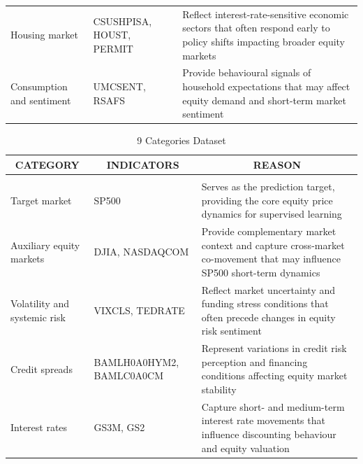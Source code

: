 \documentclass[10pt]{article} %
\begin{document}
\begin{table}[H]
\begin{center}
\begin{tabular}{p{3.4cm} p{4.8cm} p{6.2cm}}
Housing market
& CSUSHPISA, HOUST, PERMIT
& Reflect interest-rate-sensitive economic sectors that often respond early to policy shifts impacting broader equity markets \\[6pt]

Consumption and sentiment
& UMCSENT, RSAFS
& Provide behavioural signals of household expectations that may affect equity demand and short-term market sentiment \\

\end{tabular}
\end{center}
\end{table}



\begin{table}[H]
\caption{9 Categories Dataset}
\label{tab:9_Categories_Dataset}
\begin{center}
\begin{tabular}{p{3.4cm} p{4.8cm} p{6.2cm}}
\multicolumn{1}{c}{\bf CATEGORY} &
\multicolumn{1}{c}{\bf INDICATORS} &
\multicolumn{1}{c}{\bf REASON}
\\ \hline \\

Target market
& SP500
& Serves as the prediction target, providing the core equity price dynamics for supervised learning \\[6pt]

Auxiliary equity markets
& DJIA, NASDAQCOM
& Provide complementary market context and capture cross-market co-movement that may influence SP500 short-term dynamics \\[6pt]

Volatility and systemic risk
& VIXCLS, TEDRATE
& Reflect market uncertainty and funding stress conditions that often precede changes in equity risk sentiment \\[6pt]

Credit spreads
& BAMLH0A0HYM2, BAMLC0A0CM
& Represent variations in credit risk perception and financing conditions affecting equity market stability \\[6pt]

Interest rates
& GS3M, GS2
& Capture short- and medium-term interest rate movements that influence discounting behaviour and equity valuation \\

\end{tabular}
\end{center}
\end{table}
\end{document}
